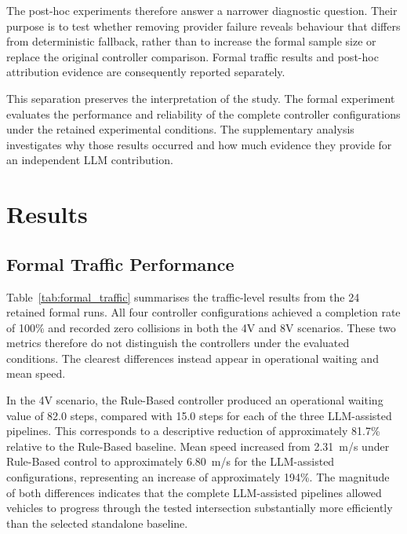 \documentclass[letterpaper,10pt,conference]{ieeeconf}
\begin{document}
The post-hoc experiments therefore answer a narrower diagnostic question. Their purpose is to test whether removing provider failure reveals behaviour that differs from deterministic fallback, rather than to increase the formal sample size or replace the original controller comparison. Formal traffic results and post-hoc attribution evidence are consequently reported separately.



This separation preserves the interpretation of the study. The formal experiment evaluates the performance and reliability of the complete controller configurations under the retained experimental conditions. The supplementary analysis investigates why those results occurred and how much evidence they provide for an independent LLM contribution.



\section{Results}



\subsection{Formal Traffic Performance}



Table~\ref{tab:formal_traffic} summarises the traffic-level results from the 24 retained formal runs. All four controller configurations achieved a completion rate of 100\% and recorded zero collisions in both the 4V and 8V scenarios. These two metrics therefore do not distinguish the controllers under the evaluated conditions. The clearest differences instead appear in operational waiting and mean speed.



In the 4V scenario, the Rule-Based controller produced an operational waiting value of 82.0 steps, compared with 15.0 steps for each of the three LLM-assisted pipelines. This corresponds to a descriptive reduction of approximately 81.7\% relative to the Rule-Based baseline. Mean speed increased from 2.31~m/s under Rule-Based control to approximately 6.80~m/s for the LLM-assisted configurations, representing an increase of approximately 194\%. The magnitude of both differences indicates that the complete LLM-assisted pipelines allowed vehicles to progress through the tested intersection substantially more efficiently than the selected standalone baseline.
\end{document}
